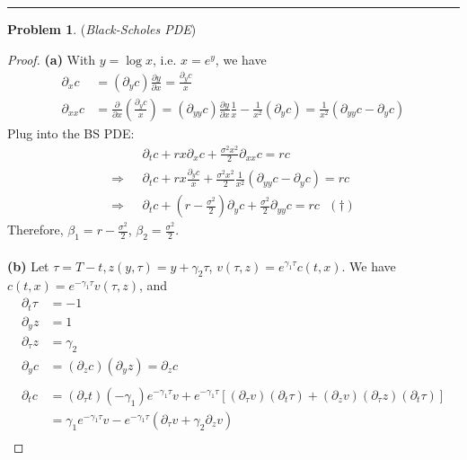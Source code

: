 \documentclass[a4paper, 10pt]{article}
\theoremstyle{definition}
\newtheorem{problem}{Problem}
\theoremstyle{hSol}
\begin{document}
\noindent\rule{16cm}{0.4pt}
\begin{problem} (\textit{Black-Scholes PDE})
\end{problem}
\begin{proof} \textbf{(a)} With $y=\log x$, i.e. $x=e^y$, we have
\begin{equation}
	\begin{split}
		\partial_x c &= (\partial_y c) \frac{\partial y}{\partial x} = \frac{\partial_y c}{x}  \\
		\partial_{xx}c &= \frac{\partial }{\partial x}\left(\frac{\partial_y c}{x}\right) = (\partial_{yy}c)\frac{\partial y}{\partial x}\frac{1}{x} - \frac{1}{x^2} (\partial_y c) = \frac{1}{x^2}(\partial_{yy}c - \partial_y c)
	\end{split}
\end{equation}
Plug into the BS PDE:
\begin{equation}
	\begin{split}
		&\partial_t c + rx\partial_x c + \frac{\sigma^2 x^2}{2}\partial_{xx}c = rc \\
		\Rightarrow~~~&\partial_t c + rx\frac{\partial_y c}{x} + \frac{\sigma^2 x^2}{2} \frac{1}{x^2}(\partial_{yy}c - \partial_y c) = rc\\
		\Rightarrow~~~&\partial_t c + \left(r-\frac{\sigma^2}{2}\right)\partial_yc + \frac{\sigma^2}{2} \partial_{yy}c = rc~~~(\dag)
	\end{split}
\end{equation}
Therefore, $\beta_1 = r-\frac{\sigma^2}{2}$, $\beta_2 = \frac{\sigma^2}{2}$.\\
~\\
\textbf{(b)} Let $\tau = T-t, z(y,\tau) = y+\gamma_2\tau $, $v(\tau,z) = e^{\gamma_1 \tau}c(t,x)$. We have $c(t,x) = e^{-\gamma_1 \tau} v(\tau, z)$, and
\begin{equation}
	\begin{split}
		\partial_{t} \tau &= -1\\
		\partial_y z &= 1\\
		\partial_{\tau} z &= \gamma_2\\
		\partial_y c &= (\partial_z c) (\partial_y z) = \partial_z c \\
		~\\
		\partial_t c &= (\partial_{\tau} t) (-\gamma_1) e^{-\gamma_1 \tau} v + e^{-\gamma_1 \tau}[(\partial_\tau v)(\partial_t \tau) + (\partial_z v) (\partial_\tau z)(\partial_t \tau)]\\
		& = \gamma_1 e^{-\gamma_1 \tau} v - e^{-\gamma_1 \tau}(\partial_{\tau}v + \gamma_2\partial_z v )\\

\end{split}
\end{equation}
\end{proof}
\end{document}
